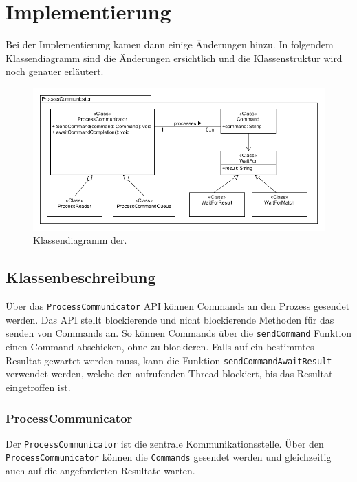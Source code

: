 \section{Implementierung}

Bei der Implementierung kamen dann einige Änderungen hinzu. In folgendem Klassendiagramm sind die Änderungen ersichtlich und die Klassenstruktur wird noch genauer erläutert.

\begin{figure}

	\centering
		\includegraphics[scale=0.75]{forthcommunication/communicator.png}
		\caption{Klassendiagramm der.}
		\label{fig:communicator}

\end{figure}

\newpage

\subsection{Klassenbeschreibung}

Über das \verb!ProcessCommunicator! API können Commands an den Prozess gesendet werden. Das API stellt blockierende und nicht blockierende Methoden für das senden von Commands an. So können Commands über die \verb!sendCommand! Funktion einen Command abschicken, ohne zu blockieren. Falls auf ein bestimmtes Resultat gewartet werden muss, kann die Funktion \verb!sendCommandAwaitResult! verwendet werden, welche den aufrufenden Thread blockiert, bis das Resultat eingetroffen ist. 

\subsubsection{ProcessCommunicator}

Der \verb!ProcessCommunicator! ist die zentrale Kommunikationsstelle. Über den \verb!ProcessCommunicator! können die \verb!Commands! gesendet werden und gleichzeitig auch auf die angeforderten Resultate warten.

